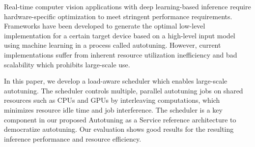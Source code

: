 Real-time computer vision applications with deep learning-based inference require hardware-specific optimization to meet stringent performance requirements. Frameworks have been developed to generate the optimal low-level implementation for a certain target device based on a high-level input model using machine learning in a process called autotuning. However, current implementations suffer from inherent resource utilization inefficiency and bad scalability which prohibits large-scale use.

In this paper, we develop a load-aware scheduler which enables large-scale autotuning. The scheduler controls multiple, parallel autotuning jobs on shared resources such as CPUs and GPUs by interleaving computations, which minimizes resource idle time and job interference. The scheduler is a key component in our proposed Autotuning as a Service reference architecture to democratize autotuning. Our evaluation shows good results for the resulting inference performance and resource efficiency.